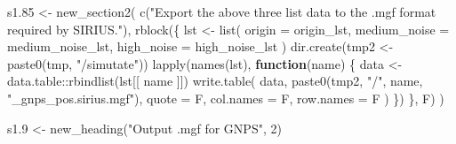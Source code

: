\documentclass[
]{article}
\newenvironment{Shaded}{\begin{snugshade}}{\end{snugshade}}
\newcommand{\AttributeTok}[1]{\textcolor[rgb]{0.77,0.63,0.00}{#1}}
\newcommand{\ControlFlowTok}[1]{\textcolor[rgb]{0.13,0.29,0.53}{\textbf{#1}}}
\newcommand{\DecValTok}[1]{\textcolor[rgb]{0.00,0.00,0.81}{#1}}
\newcommand{\FloatTok}[1]{\textcolor[rgb]{0.00,0.00,0.81}{#1}}
\newcommand{\FunctionTok}[1]{\textcolor[rgb]{0.00,0.00,0.00}{#1}}
\newcommand{\NormalTok}[1]{#1}
\newcommand{\OtherTok}[1]{\textcolor[rgb]{0.56,0.35,0.01}{#1}}
\newcommand{\SpecialCharTok}[1]{\textcolor[rgb]{0.00,0.00,0.00}{#1}}
\newcommand{\StringTok}[1]{\textcolor[rgb]{0.31,0.60,0.02}{#1}}
\begin{document}
\begin{Shaded}
\begin{Highlighting}[]
\NormalTok{s1}\FloatTok{.85} \OtherTok{\textless{}{-}} \FunctionTok{new\_section2}\NormalTok{(}
  \FunctionTok{c}\NormalTok{(}\StringTok{"Export the above three list data to the .mgf format required by SIRIUS."}\NormalTok{),}
  \FunctionTok{rblock}\NormalTok{(\{}
\NormalTok{    lst }\OtherTok{\textless{}{-}} \FunctionTok{list}\NormalTok{(}
      \AttributeTok{origin =}\NormalTok{ origin\_lst,}
      \AttributeTok{medium\_noise =}\NormalTok{ medium\_noise\_lst, }
      \AttributeTok{high\_noise =}\NormalTok{ high\_noise\_lst}
\NormalTok{    )}
    \FunctionTok{dir.create}\NormalTok{(tmp2 }\OtherTok{\textless{}{-}} \FunctionTok{paste0}\NormalTok{(tmp, }\StringTok{"/simutate"}\NormalTok{))}
    \FunctionTok{lapply}\NormalTok{(}\FunctionTok{names}\NormalTok{(lst),}
      \ControlFlowTok{function}\NormalTok{(name) \{}
\NormalTok{        data }\OtherTok{\textless{}{-}}\NormalTok{ data.table}\SpecialCharTok{::}\FunctionTok{rbindlist}\NormalTok{(lst[[ name ]])}
        \FunctionTok{write.table}\NormalTok{(}
\NormalTok{          data, }\FunctionTok{paste0}\NormalTok{(tmp2, }\StringTok{"/"}\NormalTok{, name, }\StringTok{"\_gnps\_pos.sirius.mgf"}\NormalTok{),}
          \AttributeTok{quote =}\NormalTok{ F, }\AttributeTok{col.names =}\NormalTok{ F, }\AttributeTok{row.names =}\NormalTok{ F}
\NormalTok{        )}
\NormalTok{      \})}
\NormalTok{  \}, F)}
\NormalTok{)}

\NormalTok{s1}\FloatTok{.9} \OtherTok{\textless{}{-}} \FunctionTok{new\_heading}\NormalTok{(}\StringTok{"Output .mgf for GNPS"}\NormalTok{, }\DecValTok{2}\NormalTok{)}


\end{Highlighting}
\end{Shaded}
\end{document}
